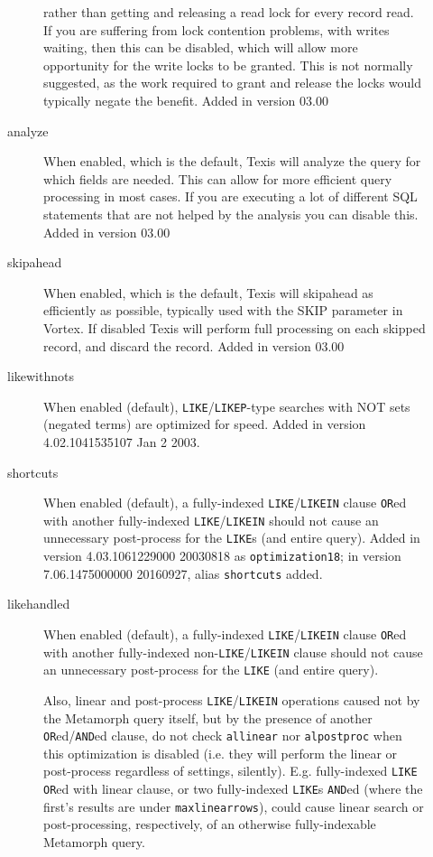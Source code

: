 \begin{description}
\begin{description}
rather than getting and releasing a read lock for every record read.  If you
are suffering from lock contention problems, with writes waiting, then this
can be disabled, which will allow more opportunity for the write locks to
be granted.  This is not normally suggested, as the work required to grant
and release the locks would typically  negate the benefit.
Added in version 03.00
\item[analyze]  When enabled, which is the default, Texis will analyze the
query for which fields are needed.  This can allow for more efficient query
processing in most cases.  If you are executing a lot of different SQL
statements that are not helped by the analysis you can disable this.
Added in version 03.00
\item[skipahead]  When enabled, which is the default, Texis will skipahead
as efficiently as possible, typically used with the SKIP parameter in
Vortex.  If disabled Texis will perform full processing on each skipped
record, and discard the record.
Added in version 03.00
\item[likewithnots]  When enabled (default), \verb`LIKE`/\verb`LIKEP`-type
searches with NOT sets (negated terms) are optimized for speed.
Added in version 4.02.1041535107 Jan  2 2003.

\item[shortcuts] When enabled (default), a fully-indexed
  \verb`LIKE`/\verb`LIKEIN` clause \verb`OR`ed with another
  fully-indexed \verb`LIKE`/\verb`LIKEIN` should not cause an
  unnecessary post-process for the \verb`LIKE`s (and entire query).
  Added in version 4.03.1061229000 20030818 as \verb`optimization18`;
  in version 7.06.1475000000 20160927, alias \verb`shortcuts` added.

\item[likehandled] When enabled (default), a fully-indexed
  \verb`LIKE`/\verb`LIKEIN` clause \verb`OR`ed with another
  fully-indexed non-\verb`LIKE`/\verb`LIKEIN` clause should not cause
  an unnecessary post-process for the \verb`LIKE` (and entire query).

  Also, linear and post-process \verb`LIKE`/\verb`LIKEIN` operations
  caused not by the Metamorph query itself, but by the presence of
  another \verb`OR`ed/\verb`AND`ed clause, do not check
  \verb`allinear` nor \verb`alpostproc` when this optimization is
  disabled (i.e. they will perform the linear or post-process
  regardless of settings, silently).  E.g. fully-indexed \verb`LIKE`
  \verb`OR`ed with linear clause, or two fully-indexed \verb`LIKE`s
  \verb`AND`ed (where the first's results are under
  \verb`maxlinearrows`), could cause linear search or post-processing,
  respectively, of an otherwise fully-indexable Metamorph query.


\end{description}
\end{description}
